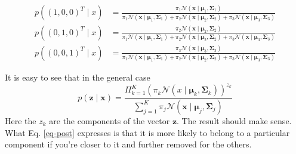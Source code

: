 \begin{align}
  p( (1, 0, 0)^T \mid x) & = \frac{ \pi_1 \mathcal{N}(\boldsymbol{x} \mid \boldsymbol{\mu}_1, \boldsymbol{\Sigma}_1)}{\pi_1 \mathcal{N}(\boldsymbol{x} \mid \boldsymbol{\mu}_1, \boldsymbol{\Sigma}_1) + \pi_2 \mathcal{N}(\boldsymbol{x} \mid \boldsymbol{\mu}_2, \boldsymbol{\Sigma}_2) + \pi_3 \mathcal{N}(\boldsymbol{x} \mid \boldsymbol{\mu}_3, \boldsymbol{\Sigma}_3)} \nonumber \\
  p( (0, 1, 0)^T \mid x) & = \frac{ \pi_2 \mathcal{N}(\boldsymbol{x} \mid \boldsymbol{\mu}_2, \boldsymbol{\Sigma}_2)}{\pi_1 \mathcal{N}(\boldsymbol{x} \mid \boldsymbol{\mu}_1, \boldsymbol{\Sigma}_1) + \pi_2 \mathcal{N}(\boldsymbol{x} \mid \boldsymbol{\mu}_2, \boldsymbol{\Sigma}_2) + \pi_3 \mathcal{N}(\boldsymbol{x} \mid \boldsymbol{\mu}_3, \boldsymbol{\Sigma}_3)} \nonumber \\
  p( (0, 0, 1)^T \mid x) & = \frac{ \pi_3 \mathcal{N}(\boldsymbol{x} \mid \boldsymbol{\mu}_3, \boldsymbol{\Sigma}_3)}{\pi_1 \mathcal{N}(\boldsymbol{x} \mid \boldsymbol{\mu}_1, \boldsymbol{\Sigma}_1) + \pi_2 \mathcal{N}(\boldsymbol{x} \mid \boldsymbol{\mu}_2, \boldsymbol{\Sigma}_2) + \pi_3 \mathcal{N}(\boldsymbol{x} \mid \boldsymbol{\mu}_3, \boldsymbol{\Sigma}_3)}
\label{eq-post}
\end{align}

It is easy to see that in the general case
\begin{equation}
p(\boldsymbol{z} \mid \boldsymbol{x} ) = \frac{ \Pi^K_{k=1}( \pi_k \mathcal{N}( x \mid \boldsymbol{\mu}_k, \boldsymbol{\Sigma}_k))^{z_{k}}}{\sum^K_{j=1} \pi_j \mathcal{N}(\boldsymbol{x} \mid \boldsymbol{\mu}_j, \boldsymbol{\Sigma}_j)}
\end{equation}
Here the $z_k$ are the components of the vector $\boldsymbol{z}$.
The result should make sense. What Eq. \ref{eq-post} expresses is that it is more likely to belong to a particular component if you're closer to it and further
removed for the others.


